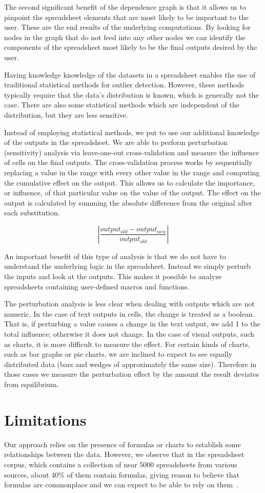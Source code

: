 {The second significant benefit of the dependence graph is that it allows
us to pinpoint the spreadsheet elements that are most likely to be
important to the user.  These are the end results of the underlying
computations.  By looking for nodes in the graph that do not feed into
any other nodes we can identify the components of the spreadsheet most
likely to be the final outputs desired by the user.

Having knowledge knowledge of the datasets in a spreadsheet enables
the use of traditional statistical methods for outlier detection.
However, these methods typically require that the data's
distribution is known, which is generally not the case.  There are
also some statistical methods which are independent of the
distribution, but they are less sensitive.

Instead of employing statistical methods, we put to use our additional
knowledge of the outputs in the spreadsheet.  We are able to perform
perturbation (sensitivity) analysis via leave-one-out cross-validation
and measure the influence of cells on the final outputs.  The
cross-validation process works by sequentially replacing a value in
the range with every other value in the range and computing the
cumulative effect on the output.  This allows us to calculate the
importance, or influence, of that particular value on the value of the
output.  The effect on the output is calculated by summing the
absolute difference from the original after each substitution.

\[
\left| \frac{output_{old} - output_{new}}{output_{old}} \right|
\]

An important benefit of this type of analysis is that we do not have
to understand the underlying logic in the spreadsheet.  Instead we
simply perturb the inputs and look at the outputs.  This makes it
possible to analyze spreadsheets containing user-defined macros and
functions.

The perturbation analysis is less clear when dealing with outputs
which are not numeric.  In the case of text outputs in cells, the
change is treated as a boolean.  That is, if perturbing a value causes
a change in the text output, we add 1 to the total influence;
otherwise it does not change.  In the case of visual outputs, such as
charts, it is more difficult to measure the effect.  For certain kinds
of charts, such as bar graphs or pie charts, we are inclined to expect
to see equally distributed data (bars and wedges of approximately the
same size). Therefore in those cases we measure the perturbation
effect by the amount the result deviates from equilibrium.

\section{Limitations}

Our approach relies on the presence of formulas or charts to establish
some relationships between the data.  However, we observe that in the
spreadsheet corpus, which contains a collection of near 5000
spreadsheets from various sources, about 40\% of them contain
formulas, giving reason to believe that formulas are commonplace and
we can expect to be able to rely on them~\cite{Fisher:2005:ESC:1082983.1083242}.
}
